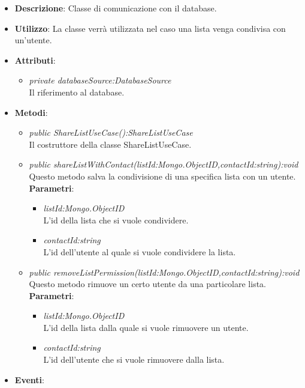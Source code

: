 \begin{itemize}
\item \textbf{Descrizione}: Classe di comunicazione con il database.
\item \textbf{Utilizzo}: La classe verrà utilizzata nel caso una lista venga condivisa con un'utente.
\item \textbf{Attributi}: 
	\begin{itemize}
	\item \textit{private databaseSource:DatabaseSource}\\
	Il riferimento al database.
	\end{itemize}
\item \textbf{Metodi}:
	\begin{itemize}
	\item \textit{public ShareListUseCase():ShareListUseCase}\\
	Il costruttore della classe ShareListUseCase.
	\item \textit{public shareListWithContact(listId:Mongo.ObjectID,contactId:string):void}\\
	Questo metodo salva la condivisione di una specifica lista con un utente.
				\\ \textbf{Parametri}: \begin{itemize}
			\item \textit{listId:Mongo.ObjectID}\\
			L'id della lista che si vuole condividere.
			\item \textit{contactId:string}\\
			L'id dell'utente al quale si vuole condividere la lista.
					\end{itemize} 
	\item \textit{public removeListPermission(listId:Mongo.ObjectID,contactId:string):void}\\
	Questo metodo rimuove un certo utente da una particolare lista.
				\\ \textbf{Parametri}: \begin{itemize}
			\item \textit{listId:Mongo.ObjectID}\\
			L'id della lista dalla quale si vuole rimuovere un utente.
			\item \textit{contactId:string}\\
			L'id dell'utente che si vuole rimuovere dalla lista.
					\end{itemize}
	\end{itemize}
\item \textbf{Eventi}:
\end{itemize}

